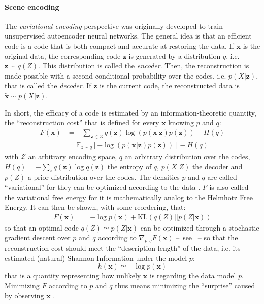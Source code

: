 \documentclass[12pt,twoside,openright]{article}
\begin{document}
\paragraph{Scene encoding}\label{sec:encoding}
The \emph{variational encoding} perspective \cite{hinton1994autoencoders} was originally developed 
to train unsupervised autoencoder neural networks. The general idea is that an efficient code 
is a code that is both compact and accurate at restoring the data. 
If $\boldsymbol{x}$ is the original data, the corresponding code $\boldsymbol{z}$ is generated by a distribution $q$, i.e. $\boldsymbol{z} \sim q(Z)$. This distribution is called the \emph{encoder}. Then, the reconstruction is made possible with a second conditional probability over the codes, i.e. $p(X|\boldsymbol{z})$, that is called the \emph{decoder}. If $\boldsymbol{z}$ is the current code, the reconstructed data is $\tilde{\boldsymbol{x}} \sim p(X|\boldsymbol{z})$. 
 
In short, the efficacy of a code is estimated by an information-theoretic quantity, the ``reconstruction cost'' that is defined for every $\boldsymbol{x}$ knowing $p$ and $q$:
\begin{align}
F(\boldsymbol{x}) &= - \sum_{\boldsymbol{z} \in \mathcal{Z}} q(\boldsymbol{z}) \log (p(\boldsymbol{x}|\boldsymbol{z})p(\boldsymbol{z})) - H(q)\nonumber\\
&= \mathbb{E}_{z\sim q} \left[-\log (p(\boldsymbol{x}|\boldsymbol{z})p(\boldsymbol{z}))\right] - H(q)
\label{eq:FEP-energy}
\end{align}
with $\mathcal{Z}$ an arbitrary encoding space, $q$ an arbitrary distribution over the codes, $H(q) = -\sum_z q(\boldsymbol{z}) \log q(\boldsymbol{z})$ the entropy of $q$, $p(X|Z)$ the decoder and $p(Z)$ a prior distribution over the codes.
The densities $p$ and $q$ are called ``variational'' for they can be optimized according to the data \cite{hinton2006fast,kingma2013auto}.  
$F$ is also called the variational free energy for it is mathematically analog to the Helmhotz Free Energy.
It can then be shown, with some reordering, that:
\begin{align}
F(\boldsymbol{x}) 
&= - \log p(\boldsymbol{x}) + \text{KL}(q(Z)||p(Z|\boldsymbol{x}))
\label{eq:FEP}
\end{align}
so that an optimal code $q(Z)\simeq p(Z|\boldsymbol{x})$ can be optimized through a stochastic gradient descent over $p$ and $q$ according to $\nabla_{p,q} F(\boldsymbol{x}) $	 --~see \cite{kingma2013auto}~-- so that the reconstruction cost should meet the ``description length'' of the data, i.e. its estimated (natural) Shannon Information under the model $p$:
$$h(\boldsymbol{x}) \simeq -\log p(\boldsymbol{x}) %
$$
that is a quantity representing how unlikely $\boldsymbol{x}$ is regarding the data model $p$. Minimizing $F$ according to $p$ and $q$ thus means minimizing the ``surprise'' caused by observing $\boldsymbol{x}$ \cite{friston2010free}.
 
\end{document}
